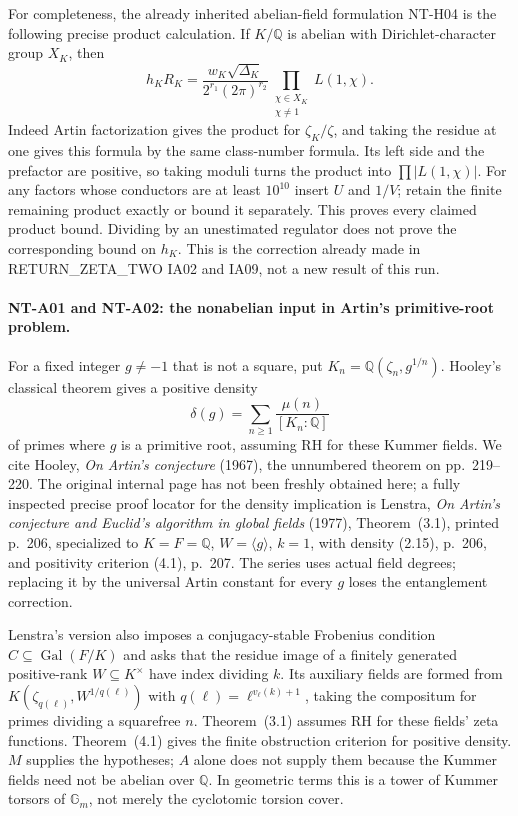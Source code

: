 \documentclass[11pt,a4paper]{article}
\begin{document}
For completeness, the already inherited abelian-field formulation
NT-H04 is the following precise product calculation.  If $K/\mathbb Q$
is abelian with Dirichlet-character group $X_K$, then
\[
 h_KR_K=\frac{w_K\sqrt{\Delta_K}}{2^{r_1}(2\pi)^{r_2}}
              \prod_{\substack{\chi\in X_K\\\chi\ne1}}L(1,\chi).
\tag{NT-H04}
\]
Indeed Artin factorization gives the product for $\zeta_K/\zeta$,
and taking the residue at one gives this formula by the same class-number
formula.  Its left side and the prefactor are positive, so taking moduli
turns the product into $\prod|L(1,\chi)|$.  For any factors whose
conductors are at least $10^{10}$ insert $U$ and $1/V$; retain the finite
remaining product exactly or bound it separately.  This proves every
claimed product bound.  Dividing by an unestimated regulator does not
prove the corresponding bound on $h_K$.  This is the correction already
made in RETURN\_ZETA\_TWO IA02 and IA09, not a new result of this run.

\paragraph{NT-A01 and NT-A02: the nonabelian input in Artin's primitive-root problem.}
For a fixed integer $g\ne-1$ that is not a square, put
$K_n=\mathbb Q(\zeta_n,g^{1/n})$.  Hooley's classical theorem gives a
positive density
\[
 \delta(g)=\sum_{n\ge1}\frac{\mu(n)}{[K_n:\mathbb Q]}
\]
of primes where $g$ is a primitive root, assuming RH for these Kummer
fields.  We cite Hooley, \emph{On Artin's conjecture} (1967), the
unnumbered theorem on pp.~219--220.  The original internal page has not
been freshly obtained here; a fully inspected precise proof locator for
the density implication is Lenstra, \emph{On Artin's conjecture and
Euclid's algorithm in global fields} (1977), Theorem~(3.1), printed
p.~206, specialized to $K=F=\mathbb Q$, $W=\langle g\rangle$, $k=1$,
with density (2.15), p.~206, and positivity criterion (4.1), p.~207.
The series uses actual field degrees; replacing it by the universal
Artin constant for every $g$ loses the entanglement correction.

Lenstra's version also imposes a conjugacy-stable Frobenius condition
$C\subseteq\operatorname{Gal}(F/K)$ and asks that the residue image of
a finitely generated positive-rank $W\subseteq K^\times$ have index
dividing $k$.  Its auxiliary fields are formed from
$K(\zeta_{q(\ell)},W^{1/q(\ell)})$ with
$q(\ell)=\ell^{v_\ell(k)+1}$, taking the compositum for primes dividing
a squarefree $n$.  Theorem~(3.1) assumes RH for these fields' zeta
functions.  Theorem~(4.1) gives the finite obstruction criterion for
positive density.  $M$ supplies the hypotheses; $A$ alone does not
supply them because the Kummer fields need not be abelian over
$\mathbb Q$.  In geometric terms this is a tower of Kummer torsors of
$\mathbb G_m$, not merely the cyclotomic torsion cover.
\end{document}
